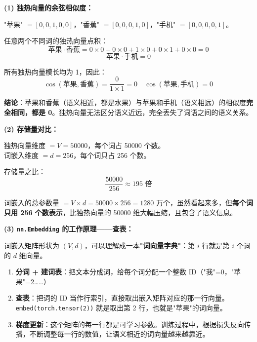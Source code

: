 \documentclass[a4paper,11pt]{ctexart}
\begin{document}
\begin{solutionbox}[参考答案与详细解析]
    \textbf{(1) 独热向量的余弦相似度：}

    "苹果" $=[0,0,1,0,0]$，"香蕉" $=[0,0,0,1,0]$，"手机" $=[0,0,0,0,1]$。

    任意两个不同词的独热向量点积：
    \[
    \text{苹果} \cdot \text{香蕉} = 0\times0 + 0\times0 + 1\times0 + 0\times1 + 0\times0 = 0
    \]
    \[
    \text{苹果} \cdot \text{手机} = 0
    \]

    所有独热向量模长均为 1，因此：
    \[
    \cos(\text{苹果}, \text{香蕉}) = \frac{0}{1 \times 1} = 0 \quad \cos(\text{苹果}, \text{手机}) = 0
    \]

    \textbf{结论}：苹果和香蕉（语义相近，都是水果）与苹果和手机（语义相远）的相似度\textbf{完全相同，都是 0}。独热向量无法区分语义近远，完全丢失了词语之间的语义关系。

    \vspace{0.5em}
    \textbf{(2) 存储量对比：}

    独热向量维度 $= V = 50000$，每个词占 50000 个数。\\
    词嵌入维度 $= d = 256$，每个词只占 256 个数。

    存储量之比：
    \[
    \frac{50000}{256} \approx 195 \text{ 倍}
    \]

    词嵌入的总参数量 $= V \times d = 50000 \times 256 = 1280$ 万个，虽然看起来多，但\textbf{每个词只用 256 个数表示}，比独热向量的 50000 维大幅压缩，且包含了语义信息。

    \vspace{0.5em}
    \textbf{(3) \texttt{nn.Embedding} 的工作原理——查表：}

    词嵌入矩阵形状为 $(V, d)$，可以理解成一本\textbf{"词向量字典"}：第 $i$ 行就是第 $i$ 个词的 $d$ 维向量。

    \begin{keybox}
        \begin{enumerate}
            \item \textbf{分词 + 建词表}：把文本分成词，给每个词分配一个整数 ID（"我"=0，"苹果"=2……）
            \item \textbf{查表}：把词的 ID 当作行索引，直接取出嵌入矩阵对应的那一行向量。\texttt{embed(torch.tensor(2))} 就是取出第 2 行，也就是"苹果"的词向量。
            \item \textbf{梯度更新}：这个矩阵的每一行都是可学习参数。训练过程中，根据损失反向传播，不断调整每一行的数值，让语义相近的词向量越来越靠近。
        \end{enumerate}
    \end{keybox}


\end{solutionbox}
\end{document}
